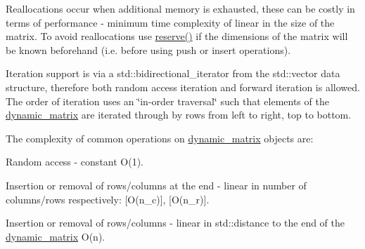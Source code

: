 Reallocations occur when additional memory is exhausted, these can be costly in terms of performance -\/ minimum time complexity of linear in the size of the matrix. To avoid reallocations use {\ttfamily \hyperlink{classcrsc_1_1dynamic__matrix_a532e7e00e645204d65691d5a9a3b2d6a}{reserve()}} if the dimensions of the matrix will be known beforehand (i.\+e. before using {\ttfamily push} or {\ttfamily insert} operations).

Iteration support is via a {\ttfamily std\+::bidirectional\+\_\+iterator} from the {\ttfamily std\+::vector} data structure, therefore both random access iteration and forward iteration is allowed. The order of iteration uses an \char`\"{}in-\/order traversal\char`\"{} such that elements of the {\ttfamily \hyperlink{classcrsc_1_1dynamic__matrix}{dynamic\+\_\+matrix}} are iterated through by rows from left to right, top to bottom.

The complexity of common operations on {\ttfamily \hyperlink{classcrsc_1_1dynamic__matrix}{dynamic\+\_\+matrix}} objects are\+:


\begin{DoxyItemize}
\item Random access -\/ constant O(1).
\item Insertion or removal of rows/columns at the end -\/ linear in number of columns/rows respectively\+: \mbox{[}O(n\+\_\+c)\mbox{]}, \mbox{[}O(n\+\_\+r)\mbox{]}.
\item Insertion or removal of rows/columns -\/ linear in {\ttfamily std\+::distance} to the end of the {\ttfamily \hyperlink{classcrsc_1_1dynamic__matrix}{dynamic\+\_\+matrix}} O(n).
\end{DoxyItemize}


